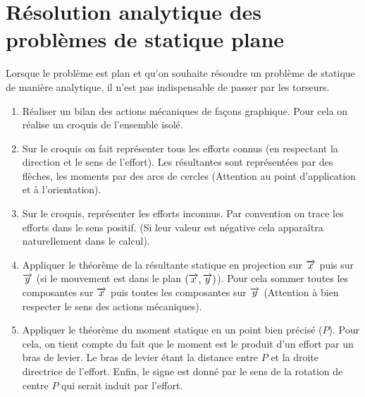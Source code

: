 \documentclass[10pt]{article}
\begin{document}
\section{Résolution analytique des problèmes de statique plane}

\begin{methode}
Lorsque le problème est plan et qu'on souhaite résoudre un problème de statique de manière analytique, il n'est pas indispensable de passer par les torseurs. 

\begin{enumerate}
\item Réaliser un bilan des actions mécaniques de façons graphique. Pour cela on réalise un croquis de l'ensemble isolé. 
\item Sur le croquis on fait représenter tous les efforts connus (en respectant la direction et le sens de l'effort). Les résultantes sont représentées par des flèches, les moments par des arcs de cercles (Attention au point d'application et à l'orientation).
\item Sur le croquis, représenter les efforts inconnus. Par convention on trace les efforts dans le sens positif. (Si leur valeur est négative cela apparaîtra naturellement dans le calcul).
\item Appliquer le théorème de la résultante statique en projection sur $\overrightarrow{x}$ puis sur $\overrightarrow{y}$ (si le mouvement est dans le plan $\left(\overrightarrow{x},\overrightarrow{y}\right)$). Pour cela sommer toutes les composantes sur $\overrightarrow{x}$ puis toutes les composantes sur $\overrightarrow{y}$ (Attention à bien respecter le sens des actions mécaniques).
\item Appliquer le théorème du moment statique en un point bien précisé ($P$). Pour cela, on tient compte du fait que le moment est le produit d'un effort par un bras de levier. Le bras de levier étant la distance entre $P$ et la droite directrice de l'effort. Enfin, le signe est donné par le sens de la rotation de centre $P$ qui serait induit par l'effort. 
\end{enumerate}
\end{methode}
\end{document}
